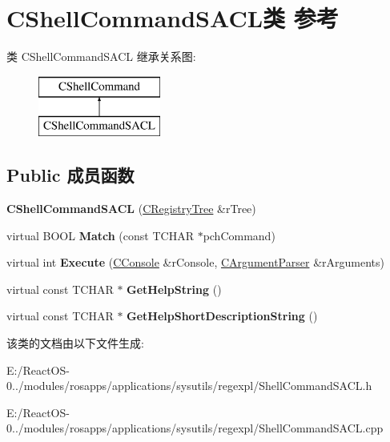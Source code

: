 \hypertarget{class_c_shell_command_s_a_c_l}{}\section{C\+Shell\+Command\+S\+A\+C\+L类 参考}
\label{class_c_shell_command_s_a_c_l}
类 C\+Shell\+Command\+S\+A\+CL 继承关系图\+:\begin{figure}[H]
\begin{center}
\leavevmode
\includegraphics[height=2.000000cm]{class_c_shell_command_s_a_c_l}
\end{center}
\end{figure}
\subsection*{Public 成员函数}
\begin{DoxyCompactItemize}
\item 
\mbox{\label{class_c_shell_command_s_a_c_l_a3aeeeb97cb90ee7e3e3a6b65d3f8e59e}} 
{\bfseries C\+Shell\+Command\+S\+A\+CL} (\hyperlink{class_c_registry_tree}{C\+Registry\+Tree} \&r\+Tree)
\item 
\mbox{\label{class_c_shell_command_s_a_c_l_aef844964b3101f30179fb34532f04fcc}} 
virtual B\+O\+OL {\bfseries Match} (const T\+C\+H\+AR $\ast$pch\+Command)
\item 
\mbox{\label{class_c_shell_command_s_a_c_l_a97146caf5a39971bb2b795cc01819758}} 
virtual int {\bfseries Execute} (\hyperlink{class_c_console}{C\+Console} \&r\+Console, \hyperlink{class_c_argument_parser}{C\+Argument\+Parser} \&r\+Arguments)
\item 
\mbox{\label{class_c_shell_command_s_a_c_l_a345ff27e1fde86b4737c2954c2d0bb48}} 
virtual const T\+C\+H\+AR $\ast$ {\bfseries Get\+Help\+String} ()
\item 
\mbox{\label{class_c_shell_command_s_a_c_l_ad65498a4e4497dbf2d24a57d9a4c99a5}} 
virtual const T\+C\+H\+AR $\ast$ {\bfseries Get\+Help\+Short\+Description\+String} ()
\end{DoxyCompactItemize}


该类的文档由以下文件生成\+:\begin{DoxyCompactItemize}
\item 
E\+:/\+React\+O\+S-\/0../modules/rosapps/applications/sysutils/regexpl/Shell\+Command\+S\+A\+C\+L.\+h\item 
E\+:/\+React\+O\+S-\/0../modules/rosapps/applications/sysutils/regexpl/Shell\+Command\+S\+A\+C\+L.\+cpp\end{DoxyCompactItemize}

